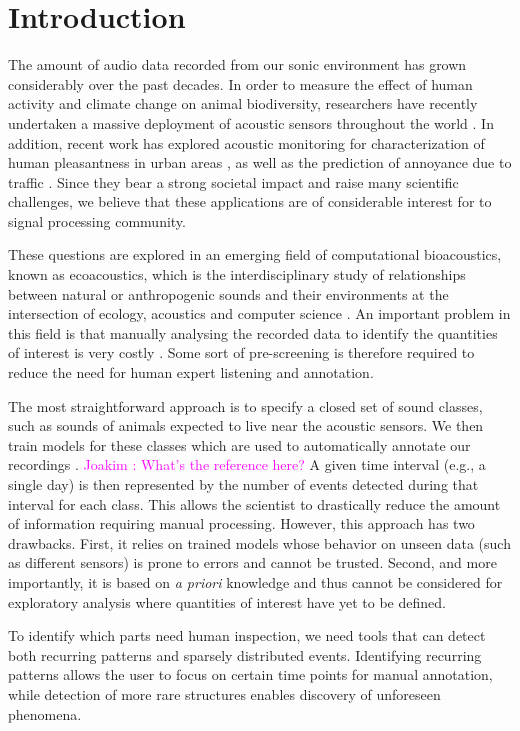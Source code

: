 \documentclass[smallextended]{svjour3}
\newcommand{\ja}[1]{\textcolor{magenta}{Joakim : #1}}
\begin{document}
\section{Introduction}

The amount of audio data recorded from our sonic environment has grown considerably over the past decades.
In order to measure the effect of human activity and climate change on animal biodiversity, researchers have recently undertaken a massive deployment of acoustic sensors throughout the world \cite{warren2006urban, NessSST13, stowell13b}.
In addition, recent work has explored acoustic monitoring for characterization of human pleasantness in urban areas \cite{guyot2005urban, ricciardi2015sound}, as well as the prediction of annoyance due to traffic \cite{gloaguen}.
Since they bear a strong societal impact and raise many scientific challenges, we believe that these applications are of considerable interest for to signal processing community.

These questions are explored in an emerging field of computational bioacoustics, known as ecoacoustics, which is the interdisciplinary study of relationships between natural or anthropogenic sounds and their environments at the intersection of ecology, acoustics and computer science \cite{krause}.
An important problem in this field is that manually analysing the recorded data to identify the quantities of interest is very costly \cite{wimmer2013sampling}. Some sort of pre-screening is therefore required to reduce the need for human expert listening and annotation.

The most straightforward approach is to specify a closed set of sound classes, such as sounds of animals expected to live near the acoustic sensors. We then train models for these classes which are used to automatically annotate our recordings \cite{}. \ja{What's the reference here?} A given time interval (e.g., a single day) is then represented by the number of events detected during that interval for each class. This allows the scientist to drastically reduce the amount of information requiring manual processing. However, this approach has two drawbacks. First, it relies on trained models whose behavior on unseen data (such as different sensors) is prone to errors and cannot be trusted. Second, and more importantly, it is based on \textit{a priori} knowledge and thus cannot be considered for exploratory analysis where quantities of interest have yet to be defined.

To identify which parts need human inspection, we need tools that can detect both recurring patterns and sparsely distributed events. Identifying recurring patterns allows the user to focus on certain time points for manual annotation, while detection of more rare structures enables discovery of unforeseen phenomena.
\end{document}
